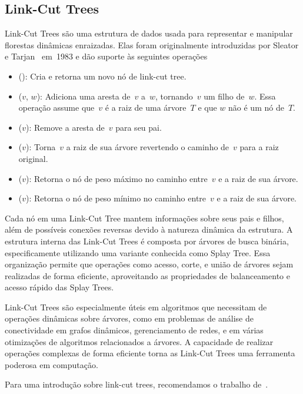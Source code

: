 \subsection{Link-Cut Trees}
\label{sec:linkcuttree}
Link-Cut Trees são uma estrutura de dados usada para representar e manipular florestas dinâmicas enraizadas.
Elas foram originalmente introduzidas por Sleator e Tarjan~\cite{SleatroTarjanLinkCutTree1983,} em~1983 e dão suporte às seguintes operações
\begin{itemize}
\item \linkcutCreate(): Cria e retorna um novo nó de link-cut tree.
\item \linkcutAddEdge($v$, $w$): Adiciona uma aresta de~$v$ a~$w$, tornando~$v$ um filho de~$w$. Essa operação assume que~$v$ é a raiz de uma árvore~$T$ e que $w$ não é um nó de~$T$.
\item \linkcutDelEdge($v$): Remove a aresta de~$v$ para seu pai.
\item \linkcutEvert($v$): Torna~$v$ a raiz de sua árvore revertendo o caminho de~$v$ para a raiz original.
\item \linkcutMax($v$): Retorna o nó de peso máximo no caminho entre~$v$ e a raiz de sua árvore.
\item \linkcutMin($v$): Retorna o nó de peso mínimo no caminho entre~$v$ e a raiz de sua árvore.
\end{itemize}

Cada nó em uma Link-Cut Tree mantem informações sobre seus pais e filhos, além de possíveis conexões reversas devido à natureza dinâmica da estrutura. A estrutura interna das Link-Cut Trees é composta por árvores de busca binária, especificamente utilizando uma variante conhecida como Splay Tree. Essa organização permite que operações como acesso, corte, e união de árvores sejam realizadas de forma eficiente, aproveitando as propriedades de balanceamento e acesso rápido das Splay Trees.

Link-Cut Trees são especialmente úteis em algoritmos que necessitam de operações dinâmicas sobre árvores, como em problemas de análise de conectividade em grafos dinâmicos, gerenciamento de redes, e em várias otimizações de algoritmos relacionados a árvores. A capacidade de realizar operações complexas de forma eficiente torna as Link-Cut Trees uma ferramenta poderosa em computação.

Para uma introdução sobre link-cut trees, recomendamos o trabalho de~\cite{linkcuttree}.



